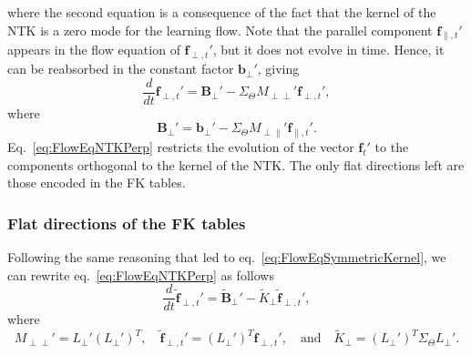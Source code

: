 \documentclass[11pt]{article}
\begin{document}
where the second equation is a consequence of the fact that the kernel of the
NTK is a zero mode for the learning flow. Note that the parallel component
$\pmb{f}_{\parallel,t}'$ appears in the flow equation of $\pmb{f}_{\perp,t}'$,
but it does not evolve in time. Hence, it can be reabsorbed in the constant
factor $\pmb{b}_{\perp}'$, giving
\begin{equation}
  \frac{d}{dt} \pmb{f}_{\perp,t}' = \pmb{B}_{\perp}' - 
  \Sigma_{\Theta} M_{\perp \perp}' \pmb{f}_{\perp,t}',
  \label{eq:FlowEqNTKPerp}
\end{equation}
where
\begin{equation}
  \pmb{B}_{\perp}' = \pmb{b}_{\perp}' - \Sigma_{\Theta} M_{\perp \parallel}' \pmb{f}_{\parallel,t}'.
\end{equation}
Eq.~\eqref{eq:FlowEqNTKPerp} restricts the evolution of the vector $\pmb{f}_t'$
to the components orthogonal to the kernel of the NTK. The only flat directions
left are those encoded in the FK tables.

\subsubsection*{Flat directions of the FK tables}
Following the same reasoning that led to eq.~\eqref{eq:FlowEqSymmetricKernel}, we can
rewrite eq.~\eqref{eq:FlowEqNTKPerp} as follows
\begin{equation}
  \frac{d}{dt} \tilde{\pmb{f}}_{\perp,t}' = \tilde{\pmb{B}}_{\perp}' - \tilde{K}_{\perp} \tilde{\pmb{f}}_{\perp,t}',
  \label{eq:FlowEqSymmetricKernelPerp}
\end{equation}
where
\begin{equation}
  M_{\perp \perp}' = L_{\perp}' (L_{\perp}')^T, \quad
  \tilde{\pmb{f}}_{\perp,t}' = (L_{\perp}')^T \pmb{f}_{\perp,t}', \quad
  \text{and} \quad
  \tilde{K}_{\perp} = (L_{\perp}')^T \Sigma_{\Theta} L_{\perp}'.
\end{equation}
\end{document}

